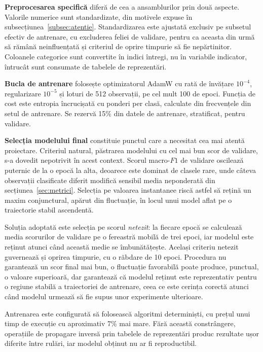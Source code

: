 \textbf{Preprocesarea specifică} diferă de cea a ansamblurilor prin două aspecte. Valorile numerice sunt standardizate, din motivele expuse în subsecțiunea~\ref{subsec:atentie}. Standardizarea este ajustată exclusiv pe subsetul efectiv de antrenare, cu excluderea feliei de validare, pentru ca aceasta din urmă să rămână neinfluențată și criteriul de oprire timpurie să fie nepărtinitor. Coloanele categorice sunt convertite în indici întregi, nu în variabile indicator, întrucât sunt consumate de tabelele de reprezentări.

\textbf{Bucla de antrenare} folosește optimizatorul AdamW cu rată de învățare $10^{-4}$, regularizare $10^{-5}$ și loturi de 512 observații, pe cel mult 100 de epoci. Funcția de cost este entropia încrucișată cu ponderi per clasă, calculate din frecvențele din setul de antrenare. Se rezervă 15\% din datele de antrenare, stratificat, pentru validare.

\textbf{Selecția modelului final} constituie punctul care a necesitat cea mai atentă proiectare. Criteriul natural, păstrarea modelului cu cel mai bun scor de validare, s-a dovedit nepotrivit în acest context. Scorul macro-$F1$ de validare oscilează puternic de la o epocă la alta, deoarece este dominat de clasele rare, unde câteva observații clasificate diferit modifică sensibil media neponderată din secțiunea~\ref{sec:metrici}. Selecția pe valoarea instantanee riscă astfel să rețină un maxim conjunctural, apărut din fluctuație, în locul unui model aflat pe o traiectorie stabil ascendentă.

Soluția adoptată este selecția pe scorul \emph{netezit}: la fiecare epocă se calculează media scorurilor de validare pe o fereastră mobilă de trei epoci, iar modelul este reținut atunci când această medie se îmbunătățește. Același criteriu netezit guvernează și oprirea timpurie, cu o răbdare de 10 epoci. Procedura nu garantează un scor final mai bun, o fluctuație favorabilă poate produce, punctual, o valoare superioară, dar garantează că modelul reținut este reprezentativ pentru o regiune stabilă a traiectoriei de antrenare, ceea ce este cerința corectă atunci când modelul urmează să fie supus unor experimente ulterioare.

Antrenarea este configurată să folosească algoritmi determiniști, cu prețul unui timp de execuție cu aproximativ 7\% mai mare. Fără această constrângere, operațiile de propagare inversă prin tabelele de reprezentări produc rezultate ușor diferite între rulări, iar modelul obținut nu ar fi reproductibil.

